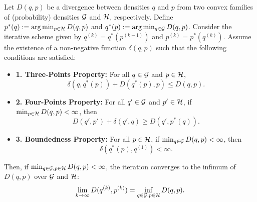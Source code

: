 \begin{myTheorem}
\label{thm:csiszar5.3}

Let \( D(q, p) \) be a divergence between densities \( q \) and \( p \) from two convex families of (probability) densities \(\mathcal{G}\) and \( \mathcal{H} \), respectively. Define \( p^*(q) := \arg\min_{p\in\mathcal{H}} D(q,p) \) and \( q^*(p) := \arg\min_{q\in \mathcal{G}} D(q,p) \). Consider the iterative scheme given by \( q^{(k)} = q^*(p^{(k-1)}) \) and \( p^{(k)} = p^*(q^{(k)}) \). Assume the existence of a non-negative function \( \delta(q, p) \) such that the following conditions are satisfied:
\begin{itemize}
    \item[] \textbf{1. Three-Points Property:} For all \( q\in \mathcal{G} \) and \( p\in\mathcal{H} \),
    \begin{equation}
        \delta(q, q^*(p)) + D(q^*(p), p) \leq D(q, p).
        \label{eq:three_point_property}
    \end{equation}
    
    \item[] \textbf{2. Four-Points Property:} For all \( q' \in \mathcal{G} \) and \( p' \in \mathcal{H} \), if \( \min_{p\in\mathcal{H}} D(q, p) < \infty \), then
    \begin{equation}
        D(q', p') + \delta(q', q) \geq D(q', p^*(q)).
        \label{eq:four_point_property}
    \end{equation}
    \item[] \textbf{3. Boundedness Property:} For all \( p\in\mathcal{H} \), if \( \min_{q\in \mathcal{G}} D(q, p) < \infty \), then
    \begin{equation}
        \delta(q^*(p), q^{(1)}) < \infty.
        \label{eq:boundedness}
    \end{equation}
\end{itemize}
Then, if \( \min_{q\in \mathcal{G}, p\in\mathcal{H}} D(q, p) < \infty \), the iteration converges to the infimum of \( D(q, p) \) over \( \mathcal{G} \) and \( \mathcal{H} \):
\[
\lim_{k \to \infty} D(q^{(k)}, p^{(k)}) = \inf_{q\in \mathcal{G}, p\in\mathcal{H}} D(q, p).
\]
\end{myTheorem}


